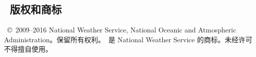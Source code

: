 \vssub
\subsection{~版权和商标}
\vssub

\ww\ \copyright\ 2009--2016 National Weather Service, National Oceanic and
Atmospheric Administration。保留所有权利。\ww\ 是 National Weather Service
的商标。未经许可不得擅自使用。
